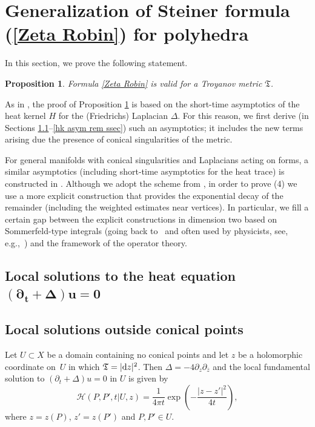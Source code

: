 \documentclass[pdftex]{sigma}
\numberwithin{equation}{section}
\newtheorem{Proposition}[Theorem]{Proposition}
\theoremstyle{definition}
\begin{document}
\section[Generalization of Steiner formula (1.4) for polyhedra]{Generalization of Steiner formula (\ref{Zeta Robin}) for polyhedra}\label{Steiner sec}
In this section, we prove the following statement.
\begin{Proposition}
\label{Zeta_Robin_prop}
Formula {\rm \eqref{Zeta Robin}} is valid for a Troyanov metric $\mathfrak{T}$.
\end{Proposition}

As in \cite{Steiner}, the proof of Proposition \ref{Zeta_Robin_prop} is based on the short-time asymptotics of the heat kernel $H$ for the (Friedrichs) Laplacian $\Delta$. For this reason, we first derive (in Sections \ref{loc sol sec}--\ref{hk asym rem ssec}) such an asymptotics; it includes the new terms arising due the presence of conical singularities of the metric.

For general manifolds with conical singularities and Laplacians acting on forms, a similar asymptotics (including short-time asymptotics for the heat trace) is constructed in \cite{Mooers}.
 Although we adopt the scheme from \cite{Mooers}, in order to prove (4) we use a more explicit construction that provides the exponential decay of the remainder (including the weighted estimates near vertices). In particular, we fill a certain gap between the explicit constructions in dimension two based on Sommerfeld-type integrals (going back to~\cite{Carslaw} and often used by physicists, see, e.g.,~\cite{Dowker}) and the framework of the operator theory.

\subsection[Local solutions to the heat equation (partial\_t+Delta)u=0]{Local solutions to the heat equation $\boldsymbol{ (\partial_t+\Delta)u=0}$}
\label{loc sol sec}
\subsection*{Local solutions outside conical points} Let $U\subset X$ be a domain containing no conical points and let $z$ be a holomorphic coordinate on~$U$ in which $\mathfrak{T}=|{\rm d}z|^2$. Then $\Delta=-4\partial_z\partial_{\overline{z}}$ and the local fundamental solution to $(\partial_t+\Delta)u=0$ in $U$ is given by
\begin{equation}
\label{HK Plane}
\mathcal{H}(P,P',t|U,z)=\frac{1}{4\pi t}\exp\left(-\frac{|z-z'|^2}{4t}\right),
\end{equation}
where $z=z(P)$, $z'=z(P')$ and $P,P'\in U$.
\end{document}
